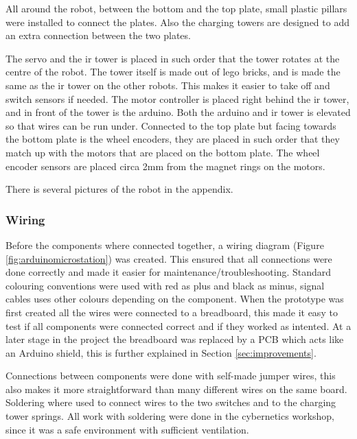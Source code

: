 All around the robot, between the bottom and the top plate, small plastic pillars were installed to connect the plates. Also the charging towers are designed to add an extra connection between the two plates.

The servo and the \acrshort{ir} tower is placed in such order that the tower rotates at the centre of the robot. The tower itself is made out of lego bricks, and is made the same as the \acrshort{ir} tower on the other robots. This makes it easier to take off and switch sensors if needed. The motor controller is placed right behind the \acrshort{ir} tower, and in front of the tower is the arduino. Both the arduino and \acrshort{ir} tower is elevated so that wires can be run under. Connected to the top plate but facing towards the bottom plate is the wheel encoders, they are placed in such order that they match up with the motors that are placed on the bottom plate. The wheel encoder sensors are placed circa 2mm from the magnet rings on the motors.

There is several pictures of the robot in the appendix.

\subsubsection{Wiring}
Before the components where connected together, a wiring diagram (Figure \ref{fig:arduinomicrostation}) was created. This ensured that all connections were done correctly and made it easier for maintenance/troubleshooting. Standard colouring conventions were used with red as plus and black as minus, signal cables uses other colours depending on the component. When the prototype was first created all the wires were connected to a breadboard, this made it easy to test if all components were connected correct and if they worked as intented. At a later stage in the project the breadboard was replaced by a PCB which acts like an Arduino shield, this is further explained in Section \ref{sec:improvements}.

Connections between components were done with self-made jumper wires, this also makes it more straightforward than many different wires on the same board. Soldering where used to connect wires to the two switches and to the charging tower springs. All work with soldering were done in the cybernetics workshop, since it was a safe environment with sufficient ventilation.